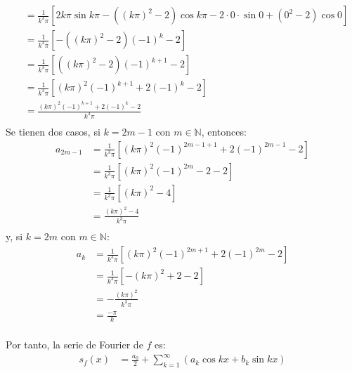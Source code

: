 \documentclass[12pt]{report}
\newcounter{it}
\theoremstyle{largebreak}
\begin{document}
\begin{sol}
\begin{itemize}
\begin{equation*}
\begin{split}
                    &=\frac{1}{k^3\pi}\left[2k\pi\sin k\pi-((k\pi)^2-2)\cos k\pi-2\cdot0\cdot\sin 0+(0^2-2)\cos 0\right]\\
                    &=\frac{1}{k^3\pi}\left[-((k\pi)^2-2)(-1)^k-2\right]\\
                    &=\frac{1}{k^3\pi}\left[((k\pi)^2-2)(-1)^{k+1}-2\right]\\
                    &=\frac{1}{k^3\pi}\left[(k\pi)^2(-1)^{k+1}+2(-1)^k-2\right]\\
                    &=\frac{(k\pi)^2(-1)^{k+1}+2(-1)^k-2}{k^3\pi}\\
                \end{split}
            \end{equation*}
            Se tienen dos casos, si $k=2m-1$ con $m\in\mathbb{N}$, entonces:
            \begin{equation*}
                \begin{split}
                    a_{2m-1}&=\frac{1}{k^3\pi}\left[(k\pi)^2(-1)^{2m-1+1}+2(-1)^{2m-1}-2\right]\\
                    &=\frac{1}{k^3\pi}\left[(k\pi)^2(-1)^{2m}-2-2\right]\\
                    &=\frac{1}{k^3\pi}\left[(k\pi)^2-4\right]\\
                    &=\frac{(k\pi)^2-4}{k^3\pi}\\
                \end{split}
            \end{equation*}
            y, si $k=2m$ con $m\in\mathbb{N}$:
            \begin{equation*}
                \begin{split}
                    a_k&=\frac{1}{k^3\pi}\left[(k\pi)^2(-1)^{2m+1}+2(-1)^{2m}-2\right]\\
                    &=\frac{1}{k^3\pi}\left[-(k\pi)^2+2-2\right]\\
                    &=-\frac{(k\pi)^2}{k^3\pi}\\
                    &=\frac{-\pi}{k}\\
                \end{split}
            \end{equation*}
        \end{itemize}
        Por tanto, la serie de Fourier de $f$ es:
        \begin{equation*}
            \begin{split}
                s_f(x)&=\frac{a_0}{2}+\sum_{ k=1}^\infty\left(a_k\cos kx+b_k\sin kx\right)\\

\end{split}
\end{equation*}
\end{sol}
\end{document}
